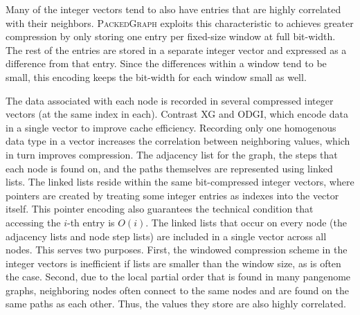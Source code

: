 \documentclass[11pt]{ucthesis}
\begin{document}
Many of the integer vectors tend to also have entries that are highly correlated with their neighbors.
\textsc{PackedGraph} exploits this characteristic to achieves greater compression by only storing one entry per fixed-size window at full bit-width.
 The rest of the entries are stored in a separate integer vector and expressed as a difference from that entry.
 Since the differences within a window tend to be small, this encoding keeps the bit-width for each window small as well.

The data associated with each node is recorded in several compressed integer vectors (at the same index in each).
Contrast \textsc{XG} and \textsc{{ODGI}}, which encode data in a single vector to improve cache efficiency.
Recording only one homogenous data type in a vector increases the correlation between neighboring values, which in turn improves compression.
The adjacency list for the graph, the steps that each node is found on, and the paths themselves are represented using linked lists.
The linked lists reside within the same bit-compressed integer vectors, where pointers are created by treating some integer entries as indexes into the vector itself.
This pointer encoding also guarantees the technical condition that accessing the $i$-th entry is $O(i)$.
The linked lists that occur on every node (the adjacency lists and node step lists) are included in a single vector across all nodes.
This serves two purposes.
First, the windowed compression scheme in the integer vectors is inefficient if lists are smaller than the window size, as is often the case.
Second, due to the local partial order that is found in many pangenome graphs, neighboring nodes often connect to the same nodes and are found on the same paths as each other.
Thus, the values they store are also highly correlated.
\end{document}
